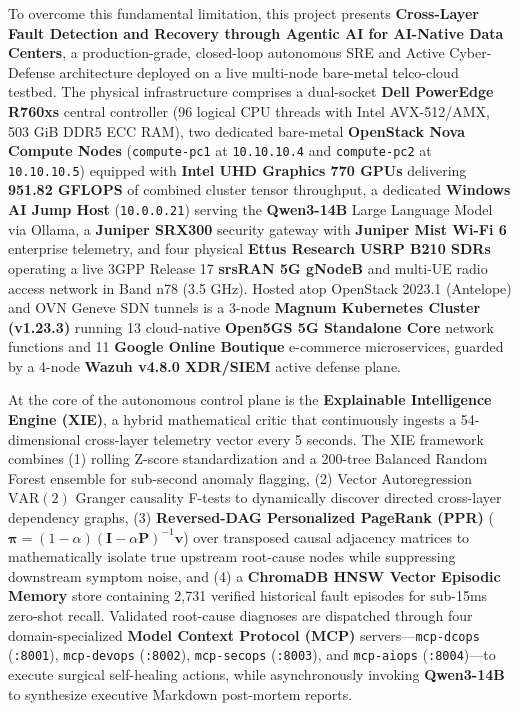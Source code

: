 To overcome this fundamental limitation, this project presents \textbf{Cross-Layer Fault Detection and Recovery through Agentic AI for AI-Native Data Centers}, a production-grade, closed-loop autonomous SRE and Active Cyber-Defense architecture deployed on a live multi-node bare-metal telco-cloud testbed. The physical infrastructure comprises a dual-socket \textbf{Dell PowerEdge R760xs} central controller (96 logical CPU threads with Intel AVX-512/AMX, 503 GiB DDR5 ECC RAM), two dedicated bare-metal \textbf{OpenStack Nova Compute Nodes} (\texttt{compute-pc1} at \texttt{10.10.10.4} and \texttt{compute-pc2} at \texttt{10.10.10.5}) equipped with \textbf{Intel UHD Graphics 770 GPUs} delivering \textbf{951.82 GFLOPS} of combined cluster tensor throughput, a dedicated \textbf{Windows AI Jump Host} (\texttt{10.0.0.21}) serving the \textbf{Qwen3-14B} Large Language Model via Ollama, a \textbf{Juniper SRX300} security gateway with \textbf{Juniper Mist Wi-Fi 6} enterprise telemetry, and four physical \textbf{Ettus Research USRP B210 SDRs} operating a live 3GPP Release 17 \textbf{srsRAN 5G gNodeB} and multi-UE radio access network in Band n78 (3.5 GHz). Hosted atop OpenStack 2023.1 (Antelope) and OVN Geneve SDN tunnels is a 3-node \textbf{Magnum Kubernetes Cluster (v1.23.3)} running 13 cloud-native \textbf{Open5GS 5G Standalone Core} network functions and 11 \textbf{Google Online Boutique} e-commerce microservices, guarded by a 4-node \textbf{Wazuh v4.8.0 XDR/SIEM} active defense plane.

At the core of the autonomous control plane is the \textbf{Explainable Intelligence Engine (XIE)}, a hybrid mathematical critic that continuously ingests a 54-dimensional cross-layer telemetry vector every 5 seconds. The XIE framework combines (1) rolling Z-score standardization and a 200-tree Balanced Random Forest ensemble for sub-second anomaly flagging, (2) Vector Autoregression $\text{VAR}(2)$ Granger causality F-tests to dynamically discover directed cross-layer dependency graphs, (3) \textbf{Reversed-DAG Personalized PageRank (PPR)} ($\boldsymbol{\pi} = (1-\alpha)(\mathbf{I}-\alpha\mathbf{P})^{-1}\mathbf{v}$) over transposed causal adjacency matrices to mathematically isolate true upstream root-cause nodes while suppressing downstream symptom noise, and (4) a \textbf{ChromaDB HNSW Vector Episodic Memory} store containing 2,731 verified historical fault episodes for sub-15ms zero-shot recall. Validated root-cause diagnoses are dispatched through four domain-specialized \textbf{Model Context Protocol (MCP)} servers---\texttt{mcp-dcops} (\texttt{:8001}), \texttt{mcp-devops} (\texttt{:8002}), \texttt{mcp-secops} (\texttt{:8003}), and \texttt{mcp-aiops} (\texttt{:8004})---to execute surgical self-healing actions, while asynchronously invoking \textbf{Qwen3-14B} to synthesize executive Markdown post-mortem reports.


